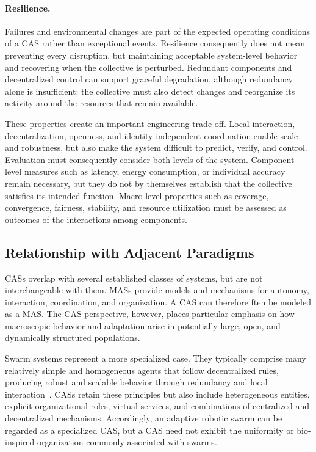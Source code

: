 \paragraph{Resilience.}
Failures and environmental changes are part of the expected operating
 conditions of a \gls{CAS} rather than exceptional events.
%
Resilience consequently does not mean preventing every disruption, but
 maintaining acceptable system-level behavior and recovering when the
 collective is perturbed.
%
Redundant components and decentralized control can support graceful
 degradation, although redundancy alone is insufficient:
 the collective must also detect changes and reorganize its activity around
 the resources that remain available.

These properties create an important engineering trade-off.
%
Local interaction, decentralization, openness, and identity-independent
 coordination enable scale and robustness, but also make the system difficult
 to predict, verify, and control.
%
Evaluation must consequently consider both levels of the system.
%
Component-level measures such as latency, energy consumption, or individual
 accuracy remain necessary, but they do not by themselves establish that the
 collective satisfies its intended function.
%
Macro-level properties such as coverage, convergence, fairness, stability,
 and resource utilization must be assessed as outcomes of the interactions
 among components.

\subsection{Relationship with Adjacent Paradigms}
\label{subsec:cas-related-paradigms}

\glspl{CAS} overlap with several established classes of systems,
 but are not interchangeable with them. 
%
\glspl{MAS} provide models and mechanisms
 for autonomy, interaction, coordination, and organization. 
% 
A \gls{CAS} can therefore ften be modeled as a \gls{MAS}. 
%
The \gls{CAS} perspective, however, 
 places particular emphasis on how macroscopic behavior 
 and adaptation arise in potentially large, open, and dynamically structured populations.

Swarm systems represent a more specialized case. 
%
They typically comprise many relatively simple 
 and homogeneous agents that follow decentralized rules,
 producing robust and scalable behavior through redundancy 
 and local interaction~\cite{DBLP:journals/swarm/BrambillaFBD13}. 
% 
\glspl{CAS} retain these principles but also include heterogeneous entities, 
 explicit organizational roles, virtual services, and combinations of centralized 
 and decentralized mechanisms. 
% 
Accordingly, 
 an adaptive robotic swarm can be regarded as a specialized \gls{CAS}, 
 but a \gls{CAS} need not exhibit the uniformity 
 or bio-inspired organization commonly associated with swarms.


